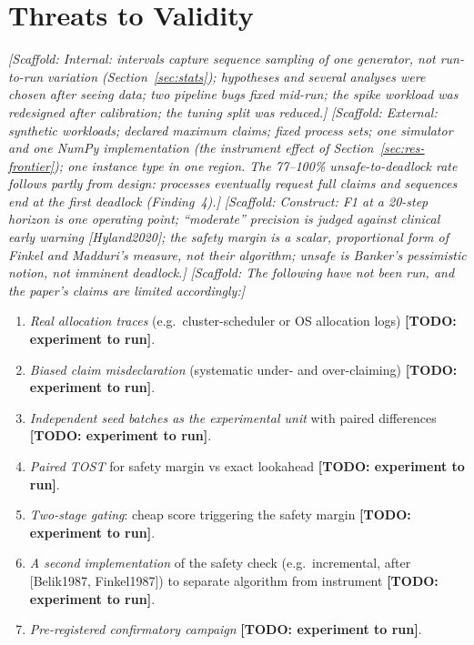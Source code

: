 \documentclass[conference]{IEEEtran}
\newcommand{\scaffold}[1]{\textcolor{blue!60!black}{\textit{[Scaffold: #1]}}}
\newcommand{\todo}[1]{\textcolor{red!70!black}{\textbf{[TODO: #1]}}}
\begin{document}
\section{Threats to Validity}\label{sec:threats}
\scaffold{Internal: intervals capture sequence sampling of one generator, not run-to-run variation (Section~\ref{sec:stats}); hypotheses and several analyses were chosen after seeing data; two pipeline bugs fixed mid-run; the spike workload was redesigned after calibration; the tuning split was reduced.}
\scaffold{External: synthetic workloads; declared maximum claims; fixed process sets; one simulator and one NumPy implementation (the instrument effect of Section~\ref{sec:res-frontier}); one instance type in one region. The 77--100\% unsafe-to-deadlock rate follows partly from design: processes eventually request full claims and sequences end at the first deadlock (Finding~4).}
\scaffold{Construct: F1 at a 20-step horizon is one operating point; ``moderate'' precision is judged against clinical early warning [Hyland2020]; the safety margin is a scalar, proportional form of Finkel and Madduri's measure, not their algorithm; unsafe is Banker's pessimistic notion, not imminent deadlock.}
\scaffold{The following have not been run, and the paper's claims are limited accordingly:}
\begin{enumerate}
\item \textit{Real allocation traces} (e.g.\ cluster-scheduler or OS allocation logs) \todo{experiment to run}.
\item \textit{Biased claim misdeclaration} (systematic under- and over-claiming) \todo{experiment to run}.
\item \textit{Independent seed batches as the experimental unit} with paired differences \todo{experiment to run}.
\item \textit{Paired TOST} for safety margin vs exact lookahead \todo{experiment to run}.
\item \textit{Two-stage gating}: cheap score triggering the safety margin \todo{experiment to run}.
\item \textit{A second implementation} of the safety check (e.g.\ incremental, after [Belik1987, Finkel1987]) to separate algorithm from instrument \todo{experiment to run}.
\item \textit{Pre-registered confirmatory campaign} \todo{experiment to run}.
\end{enumerate}

\end{document}
